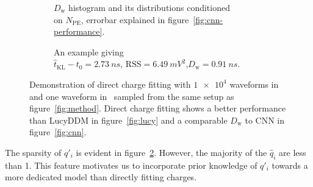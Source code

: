 \begin{figure}[H]
  \begin{subfigure}{.5\textwidth}
    \centering
    \resizebox{\textwidth}{!}{}
    \caption{\label{fig:fitting-npe} $D_\mathrm{w}$ histogram and its distributions conditioned \\ on $N_{\mathrm{PE}}$, errorbar explained in figure~\ref{fig:cnn-performance}.}
  \end{subfigure}
  \begin{subfigure}{.5\textwidth}
    \centering
    \resizebox{\textwidth}{!}{}
    \caption{\label{fig:fitting}An example giving \\ $\hat{t}_\mathrm{KL} - t_0=\SI{2.73}{ns}$, $\mathrm{RSS}=\SI{6.49}{mV^2}$,$D_\mathrm{w}=\SI{0.91}{ns}$.}
  \end{subfigure}
  \caption{\label{fig:dcf}Demonstration of direct charge fitting with $\num[retain-unity-mantissa=false]{1e4}$ waveforms in~ and one waveform in~ sampled from the same setup as figure~\ref{fig:method}.  Direct charge fitting shows a better performance than LucyDDM in figure~\ref{fig:lucy} and a comparable $D_\mathrm{w}$ to CNN in figure~\ref{fig:cnn}.}
\end{figure}

The sparsity of $q'_i$ is evident in figure~\ref{fig:fitting}.  However, the majority of the $\hat{q}_i$ are less than 1.  This feature motivates us to incorporate prior knowledge of $q'_i$ towards a more dedicated model than directly fitting charges.


